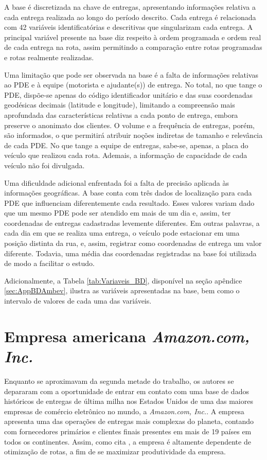 A base é discretizada na chave de entregas, apresentando informações relativa a cada entrega realizada ao longo do período descrito.
Cada entrega é relacionada com 42 variáveis identificatórias e descritivas que singularizam cada entrega.
A principal variável presente na base diz respeito à ordem programada e ordem real de cada entrega na rota, assim permitindo a comparação entre rotas programadas e rotas realmente realizadas.

Uma limitação que pode ser observada na base é a falta de informações relativas ao PDE e à equipe (motorista e ajudante(s)) de entrega.
No total, no que tange o PDE, dispõe-se apenas do código identificador unitário e das suas coordenadas geodésicas decimais (latitude e longitude), limitando a compreensão mais aprofundada das características relativas a cada ponto de entrega, embora preserve o anonimato dos clientes.
O volume e a frequência de entregas, porém, são informados, o que permitirá atribuir noções indiretas de tamanho e relevância de cada PDE. 
No que tange a equipe de entregas, sabe-se, apenas, a placa do veículo que realizou cada rota.
Ademais, a informação de capacidade de cada veículo não foi divulgada.

Uma dificuldade adicional enfrentada foi a falta de precisão aplicada às informações geográficas.
A base conta com três dados de localização para cada PDE que influenciam diferentemente cada resultado.
Esses valores variam dado que um mesmo PDE pode ser atendido em mais de um dia e, assim, ter coordenadas de entregas cadastradas levemente diferentes.
Em outras palavras, a cada dia em que se realiza uma entrega, o veículo pode estacionar em uma posição distinta da rua, e, assim, registrar como coordenadas de entrega um valor diferente. 
Todavia, uma média das coordenadas registradas na base foi utilizada de modo a facilitar o estudo. 

Adicionalmente, a Tabela \ref{tab:Variaveis_BD}, disponível na seção apêndice \ref{sec:AppBDAmbev}, ilustra as variáveis apresentadas na base, bem como o intervalo de valores de cada uma das variáveis.

\section{Empresa americana \textit{Amazon.com, Inc.}}

Enquanto se aproximavam da segunda metade do trabalho, os autores se depararam com a oportunidade de entrar em contato com uma base de dados históricos de entregas de última milha nos Estados Unidos de uma das maiores empresas de comércio eletrônico no mundo, a \textit{Amazon.com, Inc.}.
A empresa apresenta uma das operações de entregas mais complexas do planeta, contando com fornecedores primários e clientes finais presentes em mais de 19 países em todos os continentes. Assim, como cita , a empresa é altamente dependente de otimização de rotas, a fim de se maximizar produtividade da empresa.

